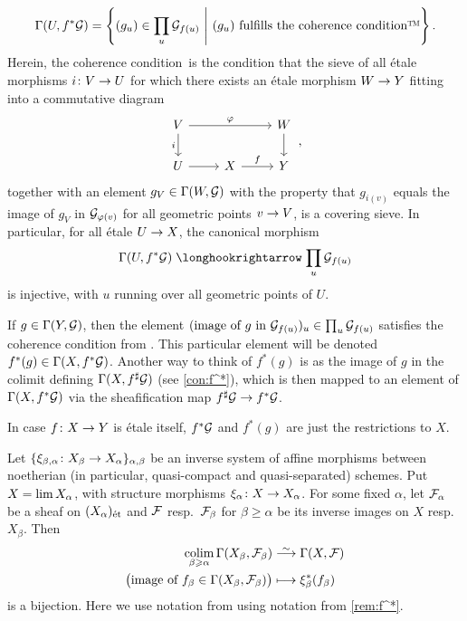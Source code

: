 \documentclass[a4paper, 10pt, oneside, DIV=9, chapterprefix=true, numbers=enddot, bibliography=totoc]{scrbook}
\begin{document}
\begin{rem}
\begin{alphanumerate}
		\begin{equation*}
			\Gamma(U,f^*\Gg)=\left\{(g_u)\in\prod_{u}\Gg_{f(u)}\st(g_u)\text{ fulfills the coherence condition\texttrademark}\right\}.
		\end{equation*}
		Herein, the coherence condition\texttrademark\ is the condition that the sieve of all étale morphisms $i\colon V\morphism U$ for which there exists an étale morphism $W\morphism Y$ fitting into a commutative diagram
		\begin{equation*}
			\begin{tikzcd}
				V\dar["i"']\ar[rr, "\phi"] & & W\dar\\
				U \rar& X\rar["f"] & Y 
			\end{tikzcd}\,,
		\end{equation*}
		together with an element $g_V\in \operatorname{\Gamma}(W,\mathcal{G})$ with the property that $g_{i(v)}$ equals the image of $g_V$ in $\mathcal{G}_{\varphi(v)}$ for all geometric points $v\morphism V$, is a covering sieve. In particular, for all étale $U\morphism X$, the canonical morphism
		\begin{equation*}
		\Global(U,f^*\Gg)\monomorphism \prod_{u}\Gg_{f(u)}
		\end{equation*}
		is injective, with $u$ running over all geometric points of $U$.
		\item If $g\in\operatorname{\Gamma}(Y,\mathcal{G})$, then the element $(\text{image of $g$ in $\mathcal{G}_{f(u)}$})_u\in\prod_u\mathcal{G}_{f(u)}$ satisfies the coherence condition from . This particular element will be denoted $f^*(g)\in \operatorname{\Gamma}(X,f^*\mathcal{G})$. Another way to think of $f^*(g)$ is as the image of $g$ in the colimit defining $\operatorname{\Gamma}(X,f^\sharp\mathcal{G})$ (see \cref{con:f^*}), which is then mapped to an element of $\operatorname{\Gamma}(X,f^*\mathcal{G})$ via the sheafification map $f^\sharp\Gg\morphism f^*\Gg$.
		\item In case $f\colon X\morphism Y$ is étale itself, $f^*\mathcal{G}$ and $f^*(g)$ are just the restrictions to $X$.
	\end{alphanumerate}
\end{rem}
\begin{prop}\label{prop:etaleInverseLimit}
	Let $\{\xi_{\beta,\alpha}\colon X_\beta\morphism X_\alpha\}_{\alpha,\beta}$ be an inverse system of affine morphisms between noetherian (in particular, quasi-compact and quasi-separated) schemes. Put $X=\operatorname*{lim} X_\alpha$, with structure morphisms $\xi_\alpha\colon X\morphism X_\alpha$. For some fixed $\alpha$, let $\mathcal{F}_\alpha$ be a sheaf on $(X_\alpha)_{\mathrm{\acute{e}t}}$ and $\mathcal{F}$ resp.\ $\mathcal{F}_\beta$ for $\beta\geq \alpha$ be its inverse images on $X$ resp.\ $X_\beta$. Then
	\begin{align*}
		\colimit_{\beta\geq \alpha}\Global(X_\beta,\Ff_\beta)&\isomorphism \Global(X,\Ff)\\
		\big(\text{image of }f_\beta\in\Global(X_\beta,\Ff_\beta)\big)&\longmapsto \xi_\beta^*(f_\beta)
	\end{align*}
	is a bijection. Here we use notation from using notation from \cref{rem:f^*}.
\end{prop}
\end{document}
